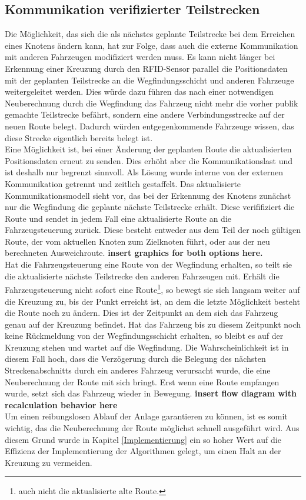 	\subsection{Kommunikation verifizierter Teilstrecken}
		
		Die Möglichkeit, das sich die als nächstes geplante Teilstrecke bei dem Erreichen eines Knotens ändern kann, hat zur Folge, dass auch die externe Kommunikation mit anderen Fahrzeugen modifiziert werden muss. Es kann nicht länger bei Erkennung einer Kreuzung durch den \ac{RFID}-Sensor parallel die Positionsdaten mit der geplanten Teilstrecke an die Wegfindungsschicht und anderen Fahrzeuge weitergeleitet werden. Dies würde dazu führen das nach einer notwendigen Neuberechnung durch die Wegfindung das Fahrzeug nicht mehr die vorher publik gemachte Teilstrecke befährt, sondern eine andere Verbindungsstrecke auf der neuen Route belegt. Dadurch würden entgegenkommende Fahrzeuge wissen, das diese Strecke eigentlich bereits belegt ist.
		\\
		Eine Möglichkeit ist, bei einer Änderung der geplanten Route die aktualisierten Positionsdaten erneut zu senden. Dies erhöht aber die Kommunikationslast und ist deshalb nur begrenzt sinnvoll. Als Lösung wurde interne von der externen Kommunikation getrennt und zeitlich gestaffelt. Das aktualisierte Kommunikationsmodell sieht vor, das bei der Erkennung des Knotens zunächst nur die Wegfindung die geplante nächste Teilstrecke erhält. Diese verififiziert die Route und sendet in jedem Fall eine aktualisierte Route an die Fahrzeugsteuerung zurück. Diese besteht entweder aus dem Teil der noch gültigen Route, der vom aktuellen Knoten zum Zielknoten führt, oder aus der neu berechneten Ausweichroute. \textbf{insert graphics for both options here.}
		\\
		Hat die Fahrzeugsteuerung eine Route von der Wegfindung erhalten, so teilt sie die aktualisierte nächste Teilstrecke den anderen Fahrzeugen mit. Erhält die Fahrzeugsteuerung nicht sofort eine Route\footnote{auch nicht die aktualisierte alte Route.}, so bewegt sie sich langsam weiter auf die Kreuzung zu, bis der Punkt erreicht ist, an dem die letzte Möglichkeit besteht die Route noch zu ändern. Dies ist der Zeitpunkt an dem sich das Fahrzeug genau auf der Kreuzung befindet. Hat das Fahrzeug bis zu diesem Zeitpunkt noch keine Rückmeldung von der Wegfindungsschicht erhalten, so bleibt es auf der Kreuzung stehen und wartet auf die Wegfindung. Die Wahrscheinlichkeit ist in diesem Fall hoch, dass die Verzögerung durch die Belegung des nächsten Streckenabschnitts durch ein anderes Fahrzeug verursacht wurde, die eine Neuberechnung der Route mit sich bringt. Erst wenn eine Route empfangen wurde, setzt sich das Fahrzeug wieder in Bewegung. \textbf{insert flow diagram with recalculation behavior here}
		\\
		Um einen reibungslosen Ablauf der Anlage garantieren zu können, ist es somit wichtig, das die Neuberechnung der Route möglichst schnell ausgeführt wird. Aus diesem Grund wurde in Kapitel \ref{Implementierung} ein so hoher Wert auf die Effizienz der Implementierung der Algorithmen gelegt, um einen Halt an der Kreuzung zu vermeiden.   
